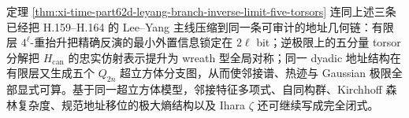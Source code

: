 \noindent
定理 \ref{thm:xi-time-part62d-leyang-branch-inverse-limit-five-torsors} 连同上述三条已经把 H.159--H.164 的 Lee--Yang 主线压缩到同一条可审计的地址几何链：有限层 \(4^\ell\)-重抬升把精确反演的最小外置信息锁定在 \(2\ell\) bit；逆极限上的五分量 torsor 分解把 \(H_{\mathrm{can}}\) 的忠实仿射表示提升为 wreath 型全局对称；同一 dyadic 地址结构在有限层又生成五个 \(Q_{2n}\) 超立方体分支图，从而使邻接谱、热迹与 Gaussian 极限全部显式可算。基于同一超立方体模型，邻接特征多项式、自同构群、Kirchhoff 森林复杂度、规范地址移位的极大熵结构以及 Ihara \(\zeta\) 还可继续写成完全闭式。

\endinput
